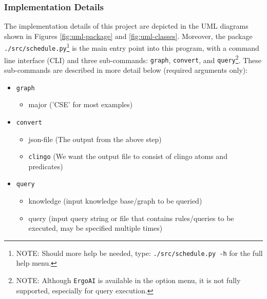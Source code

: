 \documentclass[12pt]{article}
\begin{document}
    \subsubsection{Implementation Details}
    \label{subsubsec:implementation}

    
    The implementation details of this project are depicted in the UML diagrams shown in Figures \ref{fig:uml-package} and \ref{fig:uml-classes}. Moreover, the package {\tt{./src/schedule.py}}\footnote{NOTE: Should more help be needed, type: {\tt{./src/schedule.py -h}} for the full help menu.} is the main entry point into this program, with a command line interface (CLI) and three sub-commands: {\tt{graph}}, {\tt{convert}}, and {\tt{query}}\footnote{NOTE: Although {\tt{ErgoAI}} is available in the option menu, it is not fully supported, especially for query execution.}. These sub-commands are described in more detail below (required arguments only):

    \begin{itemize}
        \item {\tt{graph}}
        \begin{itemize}
            \item major ('CSE' for most examples)
        \end{itemize}
        \item {\tt{convert}}
        \begin{itemize}
            \item json-file (The output from the above step)
            \item {\tt{clingo}} (We want the output file to consist of clingo atoms and predicates)
        \end{itemize}
        \item {\tt{query}}
        \begin{itemize}
            \item knowledge (input knowledge base/graph to be queried) 
            \item query (input query string or file that contains rules/queries to be executed, may be specified multiple times)
        \end{itemize}
    \end{itemize}
\end{document}
